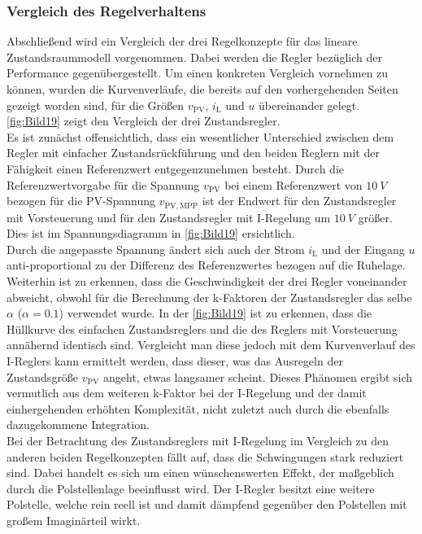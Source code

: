 \subsubsection{Vergleich des Regelverhaltens}

Abschließend wird ein Vergleich der drei Regelkonzepte für das lineare Zustandsraummodell vorgenommen. Dabei werden die Regler bezüglich der Performance gegenübergestellt. Um einen konkreten Vergleich vornehmen zu können, wurden die Kurvenverläufe, die bereits auf den vorhergehenden Seiten gezeigt worden sind, für die Größen $v_{\mathrm{PV}}$, $i_{\mathrm{L}}$ und $u$ übereinander gelegt. \autoref{fig:Bild19} zeigt den Vergleich der drei Zustandsregler. \\
\newline
Es ist zunächst offensichtlich, dass ein wesentlicher Unterschied zwischen dem Regler mit einfacher Zustandsrückführung und den beiden Reglern mit der Fähigkeit einen Referenzwert entgegenzunehmen besteht. Durch die Referenzwertvorgabe für die Spannung $v_{\mathrm{PV}}$ bei einem Referenzwert von $\SI{+10}{V}$ bezogen für die PV-Spannung $v_{\mathrm{PV,MPP}}$ ist der Endwert für den Zustandsregler mit Vorsteuerung und für den Zustandsregler mit I-Regelung um $\SI{10}{V}$ größer. Dies ist im Spannungsdiagramm in \autoref{fig:Bild19} ersichtlich.\\
Durch die angepasste Spannung ändert sich auch der Strom $i_{\mathrm{L}}$ und der Eingang $u$ anti-proportional zu der Differenz des Referenzwertes bezogen auf die Ruhelage.\\
\newline
Weiterhin ist zu erkennen, dass die Geschwindigkeit der drei Regler voneinander abweicht, obwohl für die Berechnung der k-Faktoren der Zustandsregler das selbe $\alpha$ ($\alpha = 0.1$) verwendet wurde. In der \autoref{fig:Bild19} ist zu erkennen, dass die Hüllkurve des einfachen Zustandsreglers und die des Reglers mit Vorsteuerung annähernd identisch sind. Vergleicht man diese jedoch mit dem Kurvenverlauf des I-Reglers kann ermittelt werden, dass dieser, was das Ausregeln der Zustandsgröße $v_{\mathrm{PV}}$ angeht, etwas langsamer scheint. Dieses Phänomen ergibt sich vermutlich aus dem weiteren k-Faktor bei der I-Regelung und der damit einhergehenden erhöhten Komplexität, nicht zuletzt auch durch die ebenfalls dazugekommene Integration.\\
\newline
Bei der Betrachtung des Zustandsreglers mit I-Regelung im Vergleich zu den anderen beiden Regelkonzepten fällt auf, dass die Schwingungen stark reduziert sind. Dabei handelt es sich um einen wünschenswerten Effekt, der maßgeblich durch die Polstellenlage beeinflusst wird. Der I-Regler besitzt eine weitere Polstelle, welche rein reell ist und damit dämpfend gegenüber den Polstellen mit großem Imaginärteil wirkt.

